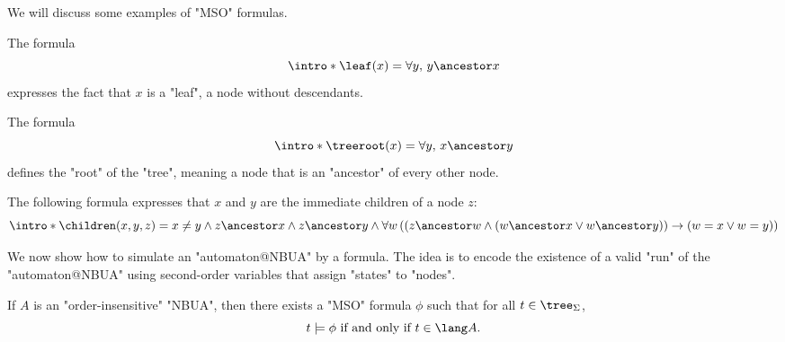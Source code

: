 \documentclass[a4paper,UKenglish,cleveref, autoref, thm-restate]{lipics-v2021}
\begin{document}
We will discuss some examples of "MSO" formulas.

\begin{example}
    \AP The formula
	\[
		\intro* \leaf(x) = \forall y,\, y \ancestor x
	\]
	expresses the fact that $x$ is a "leaf", a node without descendants.
\end{example}

\begin{example}
    \AP The formula
	\[
		\intro* \treeroot(x) = \forall y,\, x \ancestor y
	\]
	defines the "root" of the "tree", meaning a node that is an "ancestor" of every other node.
\end{example}

\begin{example}
    \AP The following formula expresses that $x$ and $y$ are the immediate children of a node $z$:
	\[
		\intro* \children(x,y,z) =
		x \neq y \land
		z \ancestor x \land  z \ancestor y \land
		\forall w
		\left( \left(
			z \ancestor w \land
				(w \ancestor x \lor w \ancestor  y) \right) \rightarrow (
			w = x \lor w = y
			)
		\right)
	\]
\end{example}

We now show how to simulate an "automaton@NBUA" by a formula. The idea is to encode the existence of a valid "run" of 
the "automaton@NBUA" using second-order variables that assign "states" to "nodes".

\begin{lemma}
	If $A$ is an "order-insensitive" "NBUA", then there exists a "MSO" formula $\phi$ such that for all $t \in \tree_{\Sigma}$,
	\[
		t \models \phi \tiff t \in \lang A.
	\]
\end{lemma}
\end{document}
